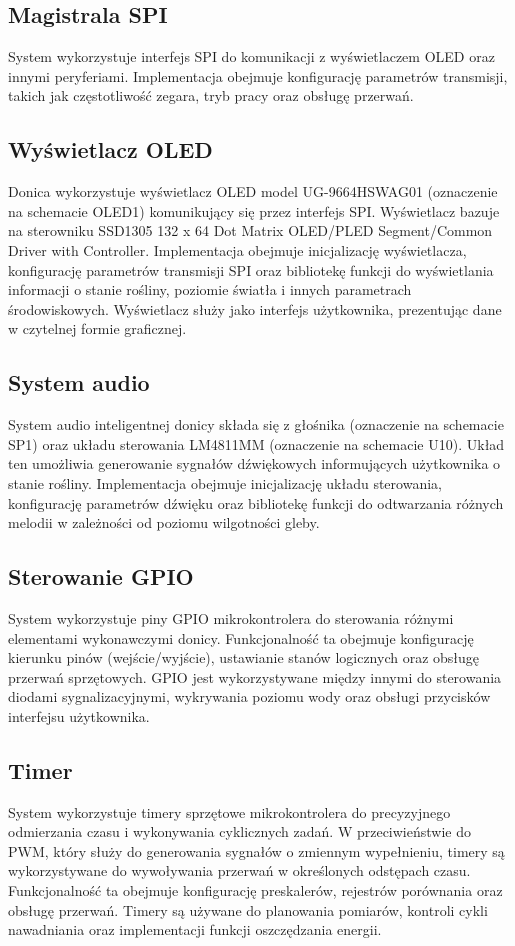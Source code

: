 \documentclass{article}
\begin{document}
\subsection{Magistrala SPI}
System wykorzystuje interfejs SPI do komunikacji z wyświetlaczem OLED oraz innymi peryferiami. Implementacja obejmuje konfigurację parametrów transmisji, takich jak częstotliwość zegara, tryb pracy oraz obsługę przerwań.

\subsection{Wyświetlacz OLED}
Donica wykorzystuje wyświetlacz OLED model UG-9664HSWAG01 (oznaczenie na schemacie OLED1) komunikujący się przez interfejs SPI. Wyświetlacz bazuje na sterowniku SSD1305 132 x 64 Dot Matrix OLED/PLED Segment/Common Driver with Controller. Implementacja obejmuje inicjalizację wyświetlacza, konfigurację parametrów transmisji SPI oraz bibliotekę funkcji do wyświetlania informacji o stanie rośliny, poziomie światła i innych parametrach środowiskowych. Wyświetlacz służy jako interfejs użytkownika, prezentując dane w czytelnej formie graficznej.

\subsection{System audio}
System audio inteligentnej donicy składa się z głośnika (oznaczenie na schemacie SP1) oraz układu sterowania LM4811MM (oznaczenie na schemacie U10). Układ ten umożliwia generowanie sygnałów dźwiękowych informujących użytkownika o stanie rośliny. Implementacja obejmuje inicjalizację układu sterowania, konfigurację parametrów dźwięku oraz bibliotekę funkcji do odtwarzania różnych melodii w zależności od poziomu wilgotności gleby.

\subsection{Sterowanie GPIO}
System wykorzystuje piny GPIO mikrokontrolera do sterowania różnymi elementami wykonawczymi donicy. Funkcjonalność ta obejmuje konfigurację kierunku pinów (wejście/wyjście), ustawianie stanów logicznych oraz obsługę przerwań sprzętowych. GPIO jest wykorzystywane między innymi do sterowania diodami sygnalizacyjnymi, wykrywania poziomu wody oraz obsługi przycisków interfejsu użytkownika.

\subsection{Timer}
System wykorzystuje timery sprzętowe mikrokontrolera do precyzyjnego odmierzania czasu i wykonywania cyklicznych zadań. W przeciwieństwie do PWM, który służy do generowania sygnałów o zmiennym wypełnieniu, timery są wykorzystywane do wywoływania przerwań w określonych odstępach czasu. Funkcjonalność ta obejmuje konfigurację preskalerów, rejestrów porównania oraz obsługę przerwań. Timery są używane do planowania pomiarów, kontroli cykli nawadniania oraz implementacji funkcji oszczędzania energii.
\end{document}
